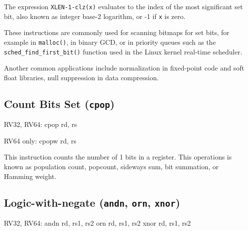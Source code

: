 

The expression {\tt XLEN-1-clz(x)} evaluates to the index of the most significant
set bit, also known as integer base-2 logarithm, or -1 if {\tt x} is zero.

These instructions are commonly used for scanning bitmaps for set bits, for
example in {\tt malloc()}, in binary GCD, or in priority queues such as the
{\tt sched\_find\_first\_bit()} function used in the Linux kernel real-time
scheduler.

Another common applications include normalization in fixed-point code and soft
float libraries, null suppression in data compression.

%
%


\subsection{Count Bits Set (\texttt{cpop})}

\begin{rvb}
  RV32, RV64:
    cpop rd, rs

  RV64 only:
    cpopw rd, rs
\end{rvb}

This instruction counts the number of 1 bits in a register. This operations is known as
population count, popcount, sideways sum, bit summation, or Hamming weight.~\cite{HammingWeight,Warren12}




\subsection{Logic-with-negate (\texttt{andn}, \texttt{orn}, \texttt{xnor})}

\begin{rvb}
  RV32, RV64:
    andn rd, rs1, rs2
    orn  rd, rs1, rs2
    xnor rd, rs1, rs2
\end{rvb}

